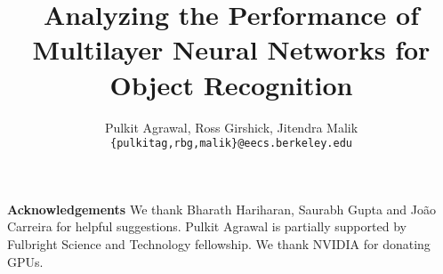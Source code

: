 \documentclass[runningheads]{llncs}
\begin{document}
\pagestyle{headings}
\mainmatter
\title{Analyzing the Performance of Multilayer Neural Networks for Object Recognition} %




\author{Pulkit Agrawal, Ross Girshick, Jitendra Malik\\
\texttt{\small \{pulkitag,rbg,malik\}@eecs.berkeley.edu}}


\maketitle





%
%


\vspace{3mm}
\noindent \textbf{Acknowledgements}
We thank Bharath Hariharan, Saurabh Gupta and Jo\~{a}o Carreira for helpful suggestions. Pulkit Agrawal is partially supported by Fulbright Science and Technology fellowship. We thank NVIDIA for donating GPUs.   










\end{document}
